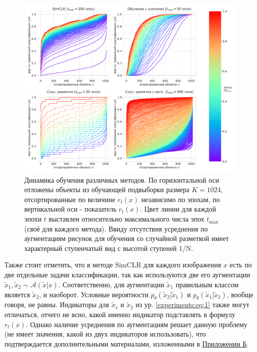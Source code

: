 \begin{figure}[H]
    \centering
    \includegraphics[width=17cm]{images/training_dynamics.pdf}
    \caption{Динамика обучения различных методов. По горизонтальной оси отложены объекты из обучающей подвыборки размера $K=1024$, отсортированные по величине $r_t(x)$ независимо по эпохам, по вертикальной оси - показатель $r_t(x)$. Цвет линии для каждой эпохи $t$ выставлен относительно максимального числа эпох $t_{\max}$ (своё для каждого метода). Ввиду отсутствия усреднения по аугментациям рисунок для обучения со случайной разметкой имеет характерный ступенчатый вид с высотой ступеней 1/N.}
    \label{experiments:pic:1}
\end{figure}{}

Также стоит отметить, что в методе SimCLR для каждого изображения $x$ есть по две отдельные задачи классификации, так как используются две его аугментации $\tilde{x}_1, \tilde{x}_2 \sim \mathcal{A}(\tilde{x}|x)$. Соответственно, для аугментации $\tilde{x}_1$ правильным классом является $\tilde{x}_2$, и наоборот. Условные вероятности $p_{\theta}(\tilde{x}_2|\tilde{x}_1)$ и $p_{\theta}(\tilde{x}_1|\tilde{x}_2)$, вообще говоря, не равны. Индикаторы для $\tilde{x}_1$ и $\tilde{x}_2$ из ур. \ref{experiments:eq:1} также могут отличаться, отчего не ясно, какой именно индикатор подставлять в формулу $r_t(x)$. Однако наличие усреднения по аугментациям решает данную проблему (не имеет значения, какой из двух индикаторов использовать), что подтверждается дополнительными материалами, изложенными в \hyperref[appendix:2]{Приложении Б}.


